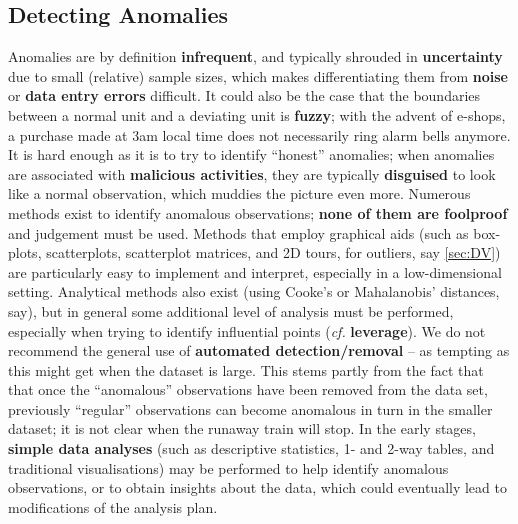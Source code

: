 \subsection{Detecting Anomalies}  Anomalies are by definition \textbf{infrequent}, and typically shrouded in \textbf{uncertainty} due to small (relative) sample sizes, which makes differentiating them from \textbf{noise} or \textbf{data entry errors} difficult. It could also be the case that the boundaries between a normal unit and a deviating unit is \textbf{fuzzy}; with the advent of e-shops, a purchase made at 3am local time does not necessarily ring alarm bells anymore. It is hard enough as it is to try to identify ``honest'' anomalies; when anomalies are associated with \textbf{malicious activities}, they are typically \textbf{disguised} to look like a normal observation, which muddies the picture even more. 
\newl
Numerous methods exist to identify anomalous observations; \textbf{none of them are foolproof} and judgement must be used. Methods that employ graphical aids (such as box-plots, scatterplots, scatterplot matrices, and 2D tours, for outliers, say \ref{sec:DV}) are particularly easy to implement and interpret, especially in a low-dimensional setting. Analytical methods also exist (using Cooke's or Mahalanobis' distances, say), but in general some additional level of analysis must be performed, especially when trying to identify influential points (\textit{cf.} \textbf{leverage}). 
\newl We do not recommend the general use of \textbf{automated detection/removal} -- as tempting as this might get when the dataset is large. This stems partly from the fact that that once the ``anomalous'' observations have been removed from the data set, previously ``regular'' observations can become anomalous in turn in the smaller dataset; it is not clear when the runaway train will stop.  \newl 
In the early stages, \textbf{simple data analyses} (such as descriptive statistics, 1- and 2-way tables, and  traditional visualisations) may be performed to help identify anomalous observations, or to obtain insights about the data, which could eventually lead to modifications of the analysis plan.
